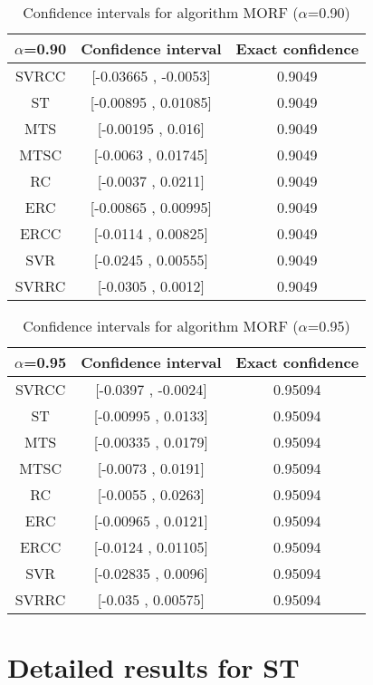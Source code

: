 \documentclass[a4paper,10pt]{article}
\begin{document}
\begin{table}[!htp]
\centering\small
\begin{tabular}{
|c|c|c|}
\hline
 $\alpha$=0.90 & Confidence interval & Exact confidence \\ \hline 
SVRCC & [-0.03665 , -0.0053] & 0.9049\\ \hline 
ST & [-0.00895 , 0.01085] & 0.9049\\ \hline 
MTS & [-0.00195 , 0.016] & 0.9049\\ \hline 
MTSC & [-0.0063 , 0.01745] & 0.9049\\ \hline 
RC & [-0.0037 , 0.0211] & 0.9049\\ \hline 
ERC & [-0.00865 , 0.00995] & 0.9049\\ \hline 
ERCC & [-0.0114 , 0.00825] & 0.9049\\ \hline 
SVR & [-0.0245 , 0.00555] & 0.9049\\ \hline 
SVRRC & [-0.0305 , 0.0012] & 0.9049\\ \hline 

\end{tabular}
\caption{Confidence intervals for algorithm MORF ($\alpha$=0.90)}
\end{table}
\begin{table}[!htp]
\centering\small
\begin{tabular}{
|c|c|c|}
\hline
 $\alpha$=0.95 & Confidence interval & Exact confidence \\ \hline 
SVRCC & [-0.0397 , -0.0024] & 0.95094\\ \hline 
ST & [-0.00995 , 0.0133] & 0.95094\\ \hline 
MTS & [-0.00335 , 0.0179] & 0.95094\\ \hline 
MTSC & [-0.0073 , 0.0191] & 0.95094\\ \hline 
RC & [-0.0055 , 0.0263] & 0.95094\\ \hline 
ERC & [-0.00965 , 0.0121] & 0.95094\\ \hline 
ERCC & [-0.0124 , 0.01105] & 0.95094\\ \hline 
SVR & [-0.02835 , 0.0096] & 0.95094\\ \hline 
SVRRC & [-0.035 , 0.00575] & 0.95094\\ \hline 

\end{tabular}
\caption{Confidence intervals for algorithm MORF ($\alpha$=0.95)}
\end{table}

 \clearpage 


\section{Detailed results for ST}
\end{document}
